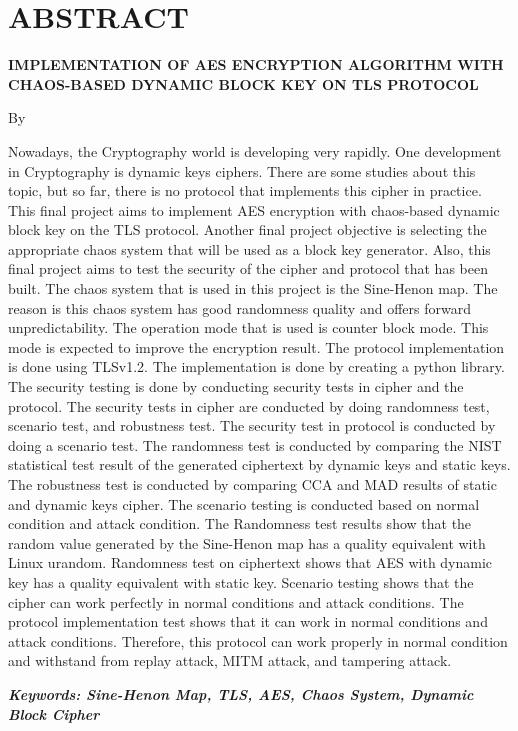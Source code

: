 \clearpage
\chapter*{ABSTRACT}

\begin{center}
  \center
  \begin{singlespace}
    \bfseries \MakeUppercase{{{Implementation of AES Encryption Algorithm with Chaos-Based Dynamic Block Key on TLS Protocol}}}

    \normalfont\normalsize
    By

    \bfseries \theauthor
  \end{singlespace}
\end{center}


\begin{singlespace}
  Nowadays, the Cryptography world is developing very rapidly. One development in Cryptography is dynamic keys ciphers. There are some studies about this topic, but so far, there is no protocol that implements this cipher in practice.  This final project aims to implement AES encryption with chaos-based dynamic block key on the TLS protocol. Another final project objective is selecting the appropriate chaos system that will be used as a block key generator. Also, this final project aims to test the security of the cipher and protocol that has been built. The chaos system that is used in this project is the Sine-Henon map. The reason is this chaos system has good randomness quality and offers forward unpredictability. The operation mode that is used is counter block mode. This mode is expected to improve the encryption result. The protocol implementation is done using TLSv1.2. The implementation is done by creating a python library. The security testing is done by conducting security tests in cipher and the protocol. The security tests in cipher are conducted by doing randomness test, scenario test, and robustness test. The security test in protocol is conducted by doing a scenario test. The randomness test is conducted by comparing the NIST statistical test result of the generated ciphertext by dynamic keys and static keys.  The robustness test is conducted by comparing CCA and MAD results of static and dynamic keys cipher. The scenario testing is conducted based on normal condition and attack condition. The Randomness test results show that the random value generated by the Sine-Henon map has a quality equivalent with Linux urandom. Randomness test on ciphertext shows that AES with dynamic key has a quality equivalent with static key. Scenario testing shows that the cipher can work perfectly in normal conditions and attack conditions. The protocol implementation test shows that it can work in normal conditions and attack conditions. Therefore, this protocol can work properly in normal condition and withstand from replay attack, MITM attack, and tampering attack.
  
  \textbf{\textit{Keywords: Sine-Henon Map, TLS, AES, Chaos System, Dynamic Block Cipher}}
\end{singlespace}

\clearpage
